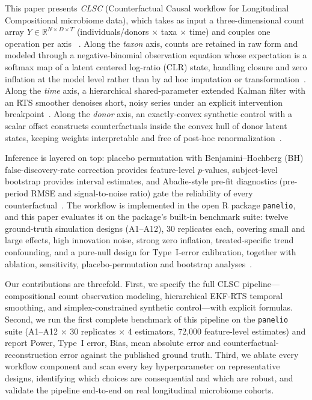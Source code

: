 \documentclass[11pt]{article}
\begin{document}
This paper presents \emph{CLSC} (Counterfactual Causal workflow for Longitudinal Compositional
microbiome data), which takes as input a three-dimensional count array $Y \in \mathbb{R}^{N \times D
\times T}$ (individuals/donors $\times$ taxa $\times$ time) and couples one operation per axis
~\cite{gerber2015longitudinal}. Along the \emph{taxon} axis, counts are retained in raw form and
modeled through a negative-binomial observation equation whose expectation is a softmax map of a latent
centered log-ratio (CLR) state, handling closure and zero inflation at the model level rather than by
ad hoc imputation or transformation~\cite{palarea2015zcompositions,diaz2019machine}. Along the
\emph{time} axis, a hierarchical shared-parameter extended Kalman filter with an RTS smoother denoises
short, noisy series under an explicit intervention breakpoint~\cite{newman2023state}. Along the
\emph{donor} axis, an exactly-convex synthetic control with a scalar offset constructs counterfactuals
inside the convex hull of donor latent states, keeping weights interpretable and free of post-hoc
renormalization~\cite{benmichael2022synthetic,chernozhukov2021exact,degliesposti2021can}.

Inference is layered on top: placebo permutation with Benjamini--Hochberg (BH) false-discovery-rate
correction provides feature-level $p$-values, subject-level bootstrap provides interval estimates, and
Abadie-style pre-fit diagnostics (pre-period RMSE and signal-to-noise ratio) gate the reliability of
every counterfactual~\cite{chernozhukov2021exact}. The workflow is implemented in the open R package
\texttt{panelio}, and this paper evaluates it on the package's built-in benchmark suite: twelve
ground-truth simulation designs (A1--A12), 30 replicates each, covering small and large effects, high
innovation noise, strong zero inflation, treated-specific trend confounding, and a pure-null design
for Type~I-error calibration, together with ablation, sensitivity, placebo-permutation and bootstrap
analyses~\cite{corander2022causal}.

Our contributions are threefold. First, we specify the full CLSC pipeline---compositional count
observation modeling, hierarchical EKF-RTS temporal smoothing, and simplex-constrained synthetic
control---with explicit formulas. Second, we run the first complete benchmark of this pipeline on the
\texttt{panelio} suite (A1--A12 $\times$ 30 replicates $\times$ 4 estimators, 72{,}000 feature-level
estimates) and report Power, Type~I error, Bias, mean absolute error and counterfactual-reconstruction
error against the published ground truth. Third, we ablate every workflow component and scan every key
hyperparameter on representative designs, identifying which choices are consequential and which are
robust, and validate the pipeline end-to-end on real longitudinal microbiome cohorts.
\end{document}

